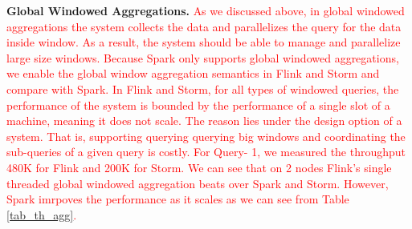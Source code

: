 \textbf{Global Windowed Aggregations.}
\textcolor{red}{As we discussed above, in global windowed aggregations the system collects the data and parallelizes the query for the data inside window. As a result, the system should be able to manage and parallelize large size windows. Because Spark only supports global windowed aggregations, we enable the global window aggregation semantics in Flink and Storm and compare with Spark. In Flink and Storm, for all types of windowed queries, the performance of the system is bounded by the performance of a single slot of a machine, meaning it does not scale. The reason lies under the design option of a system. That is, supporting querying querying big windows and coordinating the sub-queries of a given query is costly. For Query- 1, we measured the throughput 480K for Flink and 200K for Storm. We can see that on 2 nodes Flink's single threaded global windowed aggregation beats over Spark and Storm. However, Spark imrpoves the performance as it scales as we can see from Table \ref{tab_th_agg}.}































